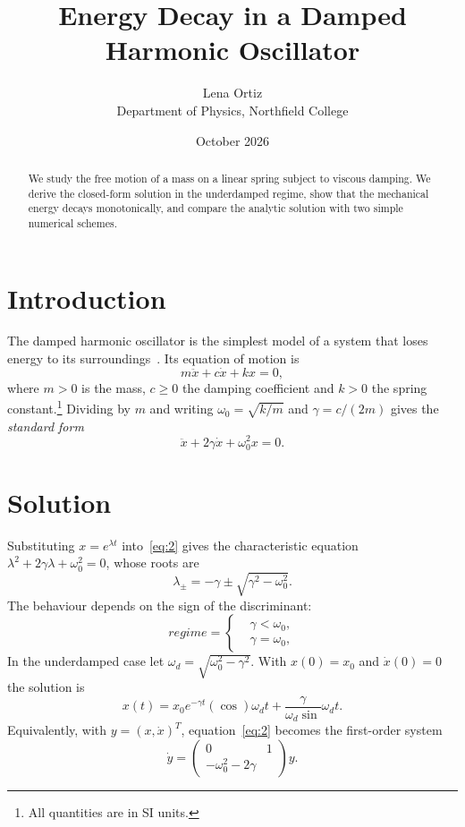 \documentclass[11pt,a4paper]{article}
\title{Energy Decay in a Damped Harmonic Oscillator}
\author{Lena Ortiz\\ \small Department of Physics, Northfield College}
\date{October 2026}
\begin{document}
\maketitle

\begin{abstract}
We study the free motion of a mass on a linear spring subject to viscous damping. We derive the closed-form solution in the underdamped regime, show that the mechanical energy decays monotonically, and compare the analytic solution with two simple numerical schemes.
\end{abstract}

\section{Introduction}\label{sec:intro}

The damped harmonic oscillator is the simplest model of a system that loses energy to its surroundings~\cite{ref1}. Its equation of motion is
\begin{equation}
  m\ddot{x}+c\dot{x}+kx=0,
  \label{eq:gauss}
\end{equation}
where $m>0$ is the mass, $c\geq0$ the damping coefficient and $k>0$ the spring constant.\footnote{All quantities are in SI units.} Dividing by $m$ and writing $\omega_{0}=\sqrt{k/m}$ and $\gamma=c/(2m)$ gives the \emph{standard form}
\begin{equation}
  \ddot{x}+2\gamma\dot{x}+\omega_{0}^{2}x=0.
  \label{eq:2}
\end{equation}

\section{Solution}

Substituting $x=e^{\lambda t}$ into~\eqref{eq:2} gives the characteristic equation $\lambda^{2}+2\gamma\lambda+\omega_{0}^{2}=0$, whose roots are
\begin{equation}
  \lambda_{\pm}=-\gamma\pm\sqrt{\gamma^{2}-\omega_{0}^{2}}.
\end{equation}
The behaviour depends on the sign of the discriminant:
\begin{equation*}
  regime=\begin{cases}
 & \gamma<\omega_{0}, \\
 & \gamma=\omega_{0},
\end{cases}
\end{equation*}
In the underdamped case let $\omega_{d}=\sqrt{\omega_{0}^{2}-\gamma^{2}}$. With $x(0)=x_{0}$ and $\dot{x}(0)=0$ the solution is
\begin{equation}
  x(t)=x_{0}e^{-\gamma t}(\cos)\omega_{d}t+\frac{\gamma}{\omega_{d}\sin}\omega_{d}t.
\end{equation}
Equivalently, with $\mathbf{}y=(x,\dot{x})^{T}$, equation~\eqref{eq:2} becomes the first-order system
\begin{equation}
  \dot{y}=\begin{pmatrix}
0 & 1 \\
-\omega_{0}^{2}-2\gamma & 
\end{pmatrix}y.
\end{equation}
\end{document}
